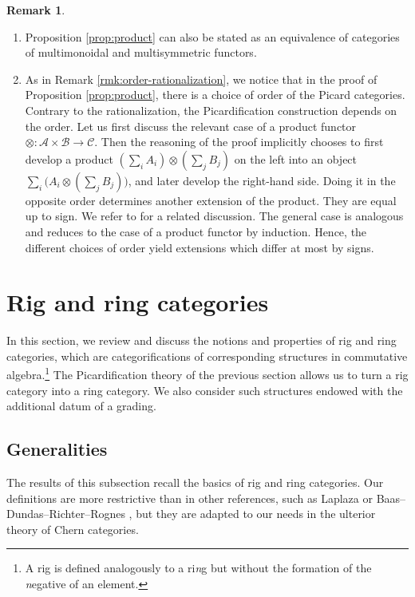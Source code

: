 \documentclass[11pt]{article}
\newcommand{\skpt}{\smallskip}
\theoremstyle{plain}
\theoremstyle{definition}
\newtheorem{remark}[theorem]{Remark}
\newcommand{\Acal}{\mathcal A}
\newcommand{\Bcal}{\mathcal B}
\newcommand{\Ccal}{\mathcal C}
\begin{document}
\skpt
\begin{remark}\label{rem:orderdevelopproduct}
\begin{enumerate}
\item Proposition \ref{prop:product} can also be stated as an equivalence of categories of multimonoidal and multisymmetric functors.
\item\label{item:orderdevelopproduct-1} As in Remark \ref{rmk:order-rationalization}, we notice that in the proof of Proposition \ref{prop:product}, there is a choice of order of the Picard categories. Contrary to the rationalization, the Picardification construction depends on the order. Let us first discuss the relevant case of a product functor $\otimes\colon\Acal\times\Bcal\to\Ccal$. Then the reasoning of the proof implicitly chooses to first develop a product $(\sum_{i} A_i) \otimes (\sum_{j} B_j)$ on the left into an object $\sum_i \bigl(A_i \otimes(\sum_{j} B_j)\bigr)$, and later develop the right-hand side. Doing it in the opposite order determines another extension of the product. They are equal up to sign. We refer to \cite[]{Deligne-determinant} for a related discussion. The general case is analogous and reduces to the case of a product functor by induction. Hence, the different choices of order yield extensions which differ at most by signs.
\end{enumerate}
\end{remark}

\section{Rig and ring categories}\label{section:ring-categories}
In this section, we review and discuss the notions and properties of rig and ring categories, which are categorifications of corresponding structures in commutative algebra.\footnote{A rig is defined analogously to a ri\emph{n}g but without the formation of the \emph{n}egative of an element.} The Picardification theory of the previous section allows us to turn a rig category into a ring category. We also consider such structures endowed with the additional datum of a grading.

\subsection{Generalities}\label{subsec:rig-and-ring-categories}
The results of this subsection recall the basics of rig and ring categories. Our definitions are more restrictive than in other references, such as Laplaza \cite{Laplaza} or Baas--Dundas--Richter--Rognes \cite{BDRR}, but they are adapted to our needs in the ulterior theory of Chern categories.
\end{document}
